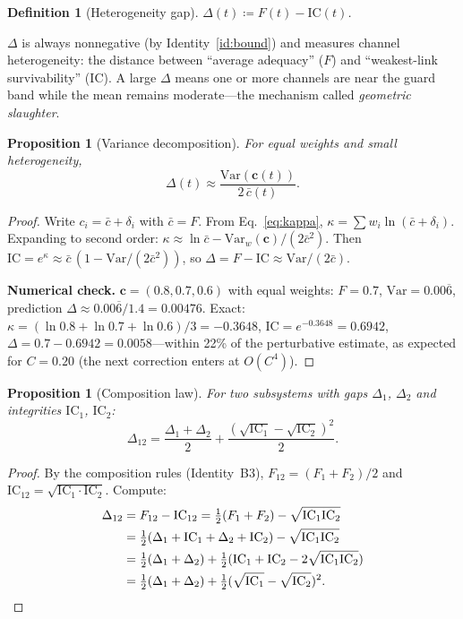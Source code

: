\documentclass[
  aps,
  prd,
  twocolumn,
  superscriptaddress,
  nofootinbib,
  floatfix
]{revtex4-2}
\newtheorem{definition}[theorem]{Definition}
\newtheorem{proposition}[theorem]{Proposition}
\newcommand{\beq}{\begin{equation}}
\newcommand{\eeq}{\end{equation}}
\newcommand{\tvec}{\mathbf{c}}
\newcommand{\IC}{\mathrm{IC}}
\begin{document}
\begin{definition}[Heterogeneity gap]
$\Delta(t) \coloneqq F(t) - \IC(t)$.
\end{definition}

$\Delta$ is always nonnegative (by Identity~\ref{id:bound}) and
measures channel heterogeneity: the distance between ``average
adequacy'' ($F$) and ``weakest-link survivability'' ($\IC$).
A large $\Delta$ means one or more channels are near the guard
band while the mean remains moderate---the mechanism called
\emph{geometric slaughter}.

\begin{proposition}[Variance decomposition]
\label{prop:variance}
For equal weights and small heterogeneity,
\beq
  \Delta(t) \approx
  \frac{\mathrm{Var}(\tvec(t))}{2\,\bar{c}(t)}.
\eeq
\end{proposition}

\begin{proof}
Write $c_i = \bar{c} + \delta_i$ with $\bar{c} = F$.  From
Eq.~\ref{eq:kappa}, $\kappa = \sum w_i \ln(\bar{c} + \delta_i)$.
Expanding to second order:
$\kappa \approx \ln\bar{c} - \mathrm{Var}_w(\tvec)/(2\bar{c}^2)$.
Then $\IC = e^\kappa \approx \bar{c}\,(1 - \mathrm{Var}/(2\bar{c}^2))$,
so $\Delta = F - \IC \approx \mathrm{Var}/(2\bar{c})$.

\noindent\textbf{Numerical check.}  $\tvec = (0.8, 0.7, 0.6)$
with equal weights: $F = 0.7$, $\mathrm{Var} = 0.00\overline{6}$,
prediction $\Delta \approx 0.00\overline{6}/1.4 = 0.00476$.
Exact: $\kappa = (\ln 0.8 + \ln 0.7 + \ln 0.6)/3 = -0.3648$,
$\IC = e^{-0.3648} = 0.6942$,
$\Delta = 0.7 - 0.6942 = 0.0058$---within 22\% of the
perturbative estimate, as expected for $C = 0.20$ (the next
correction enters at $O(C^4)$).
\end{proof}

\begin{proposition}[Composition law]
\label{prop:gap_comp}
For two subsystems with gaps $\Delta_1$, $\Delta_2$ and
integrities $\IC_1$, $\IC_2$:
\beq
  \Delta_{12} = \frac{\Delta_1+\Delta_2}{2}
    + \frac{(\sqrt{\IC_1}-\sqrt{\IC_2})^2}{2}.
\eeq
\end{proposition}

\begin{proof}
By the composition rules (Identity~B3), $F_{12} = (F_1 + F_2)/2$
and $\IC_{12} = \sqrt{\IC_1 \cdot \IC_2}$.  Compute:
\begin{align*}
  \Delta_{12}
  &= F_{12} - \IC_{12}
   = \tfrac{1}{2}(F_1 + F_2) - \sqrt{\IC_1 \IC_2} \\
  &= \tfrac{1}{2}(\Delta_1 + \IC_1 + \Delta_2 + \IC_2)
     - \sqrt{\IC_1 \IC_2} \\
  &= \tfrac{1}{2}(\Delta_1 + \Delta_2)
     + \tfrac{1}{2}(\IC_1 + \IC_2 - 2\sqrt{\IC_1\IC_2}) \\
  &= \tfrac{1}{2}(\Delta_1 + \Delta_2)
     + \tfrac{1}{2}(\sqrt{\IC_1} - \sqrt{\IC_2})^2.\qedhere
\end{align*}
\end{proof}
\end{document}
